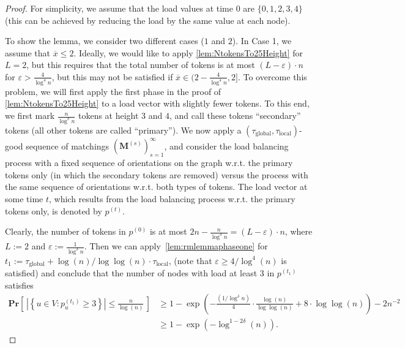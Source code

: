 \documentclass[twoside,leqno]{article}
\newcommand{\Pro}[1]{\mathbf{Pr} \left[\,#1\,\right]}
\newcommand{\M}{\mathbf{M}}
\DeclareMathOperator{\1}{\mathbf{1}}
\newcommand{\taulocal}{\tau_{\mathrm{local}}}
\newcommand{\tauglobal}{\tau_{\mathrm{global}}}
\numberwithin{equation}{section}
\let\epsilon\varepsilon
\begin{document}
\begin{proof}
For simplicity, we assume that the load values at time $0$ are $\{0,1,2,3,4\}$ (this can be achieved by reducing the load by the same value at each node).

To show the lemma, we consider two different cases ($1$ and $2$). In Case 1, we assume that $\overline{x} \leq 2$. 
Ideally, we would like to apply \cref{lem:NtokensTo25Height} for $L=2$, but this requires that the total number of tokens is at most $(L-\epsilon) \cdot n$ for $\epsilon > \frac{4}{\log^4 n}$, but this may not be satisfied if $\overline{x} \in (2 - \frac{4}{\log^4 n},2]$. To overcome this problem, we will first apply the first phase in the proof of \cref{lem:NtokensTo25Height} to a load vector with slightly fewer tokens. To this end, we first mark $\frac{n}{\log^{\delta} n}$ tokens at height $3$ and $4$, and call these tokens ``secondary'' tokens (all other tokens are called ``primary'').
We now apply a $(\tauglobal,\taulocal)$-good sequence of matchings $\left(\M^{(s)}\right)_{s=1}^{\infty}$,
and consider the load balancing process with a fixed sequence of orientations on the graph w.r.t. the primary  tokens only (in which the secondary tokens are removed) versus the process with the same sequence of orientations w.r.t. both types of tokens. The load vector at some time $t$, which results from the load balancing process w.r.t. the primary tokens only, is denoted by $p^{(t)}$. 




Clearly, the number of tokens in $p^{(0)}$  is at most $ 2n - \frac{n}{\log^{\delta} n} = (L-\epsilon) \cdot n$, where $L:=2$ and $\epsilon:=\frac{1}{\log^{\delta} n}$.
Then we can apply~\cref{lem:rmlemmaphaseone} for $t_1:=\tauglobal+\log(n)/\log\log(n) \cdot \taulocal$, (note that $\epsilon \geq 4/\log^4(n)$ is satisfied) and conclude that the number of nodes with load at least $3$ in $p^{(t_1)}$ satisfies
\begin{align*}
\Pro{  \left|\left\{ u \in V \colon p_u^{(t_1)} \geq 3 \right\} \right| \leq \frac{n}{\log(n)} } &\geq 1 - \exp\left( - \frac{ (1/\log^{
 \delta} n)}{4} \cdot \frac{\log(n)}{\log \log(n)} + 8 \cdot \log \log (n) \right) - 2 n^{-2} \\ &\geq 1 - \exp\left( -\log^{1-2  \delta} (n) \right).
\end{align*}


\end{proof}
\end{document}
